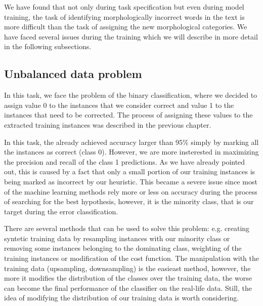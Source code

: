 
We have found that not only during task specification but even during model training,
the task of identifying morphologically incorrect words in the text is more difficult
than the task of assigning the new morphological categories. We have faced several issues
during the training which we will describe in more detail in the following subsections.



\subsection{Unbalanced data problem}

In this task, we face the problem of the binary classification, where we decided
to assign value 0 to the instances that we consider correct and value 1 to the
instances that need to be corrected. The process of assigning these values to the
extracted training instances was described in the previous chapter. 

In this task, the  already achieved accuracy larger than 95\%
simply by marking all the instances as correct (class 0). However, we are more insterested
in maximizing the precision and recall of the class 1 predictions.
As we have already pointed out, this is caused by a fact that only a small portion of our
training instances is being marked as incorrect by our heuristic.
This became a severe issue since most of the machine learning methods rely more or less on accuracy during
the process of searching for the best hypothesis, however, it is the minority
class, that is our target during the error classification.

There are several methods that can be used to solve this problem: e.g. creating syntetic
training data by resampling instances with our minority class or removing some instances
belonging to the dominating class, weighting of the training instances or modification of the
cost function. The manipulation with the training data (upsampling, downsampling) is the easieast method,
however, the more it modifies the distribution of the classes over the training data, the worse can become the final
performance of the classifier on the real-life data. Still, the idea of modifying the distribution
of our training data is worth considering.

